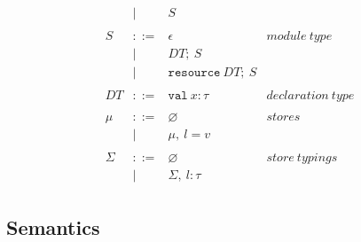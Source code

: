\documentclass{llncs}
\newcommand{\keyw}[1]{\mathtt{#1}~}
\begin{document}
\[\begin{array}{lll}
\begin{array}{lllr}
& | & S \\
&&\\
S & ::= & \epsilon & module~type \\
& | & DT;~S \\
& | & \keyw{resource} DT;~S \\
&&\\
DT & ::= & \keyw{val} x : \tau & declaration~type\\
&&\\
\mu & ::= & \varnothing & stores\\
& | & \mu,~l = v\\
&&\\
\Sigma & ::= & \varnothing & store~typings\\
& | & \Sigma,~l : \tau
\end{array}
\end{array}
\]

\newpage

\subsection{Semantics}
\end{document}
